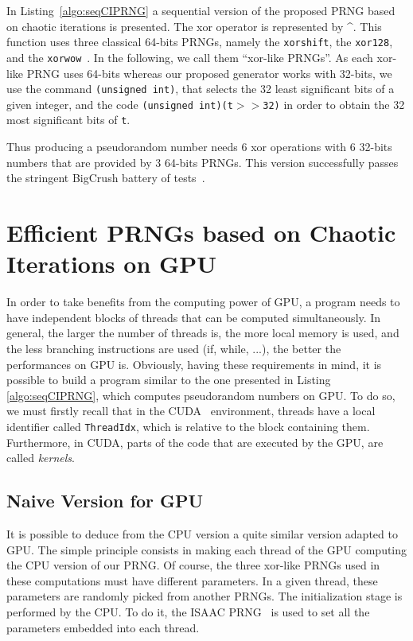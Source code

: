 \documentclass{article}
\begin{document}
In Listing~\ref{algo:seqCIPRNG} a sequential  version of the proposed PRNG based
on  chaotic  iterations  is  presented.   The xor  operator  is  represented  by
\textasciicircum.  This function uses  three classical 64-bits PRNGs, namely the
\texttt{xorshift},         the          \texttt{xor128},         and         the
\texttt{xorwow}~\cite{Marsaglia2003}.  In the following, we call them ``xor-like
PRNGs''.   As each  xor-like PRNG  uses 64-bits  whereas our  proposed generator
works with 32-bits, we use the command \texttt{(unsigned int)}, that selects the
32 least  significant bits  of a given  integer, and the  code \texttt{(unsigned
  int)(t$>>$32)} in order to obtain the 32 most significant bits of \texttt{t}.

Thus producing a pseudorandom number needs 6 xor operations with 6 32-bits numbers
that  are provided by  3 64-bits  PRNGs.  This  version successfully  passes the
stringent BigCrush battery of tests~\cite{LEcuyerS07}.

\section{Efficient PRNGs based on Chaotic Iterations on GPU}
\label{sec:efficient PRNG gpu}

In order to  take benefits from the computing power  of GPU, a program
needs  to have  independent blocks  of  threads that  can be  computed
simultaneously. In general,  the larger the number of  threads is, the
more local  memory is  used, and the  less branching  instructions are
used  (if,  while,  ...),  the  better the  performances  on  GPU  is.
Obviously, having these requirements in  mind, it is possible to build
a   program    similar   to    the   one   presented    in  Listing 
\ref{algo:seqCIPRNG}, which computes  pseudorandom numbers on GPU.  To
do  so,  we  must   firstly  recall  that  in  the  CUDA~\cite{Nvid10}
environment,    threads    have     a    local    identifier    called
\texttt{ThreadIdx},  which   is  relative  to   the  block  containing
them. Furthermore, in  CUDA, parts of  the code that are executed by the  GPU, are
called {\it kernels}.


\subsection{Naive Version for GPU}

 
It is possible to deduce from the CPU version a quite similar version adapted to GPU.
The simple principle consists in making each thread of the GPU computing the CPU version of our PRNG.  
Of course,  the  three xor-like
PRNGs  used in these computations must have different  parameters. 
In a given thread, these parameters are
randomly picked from another PRNGs. 
The  initialization stage is performed by  the CPU.
To do it, the  ISAAC  PRNG~\cite{Jenkins96} is used to  set  all  the
parameters embedded into each thread.   
\end{document}
